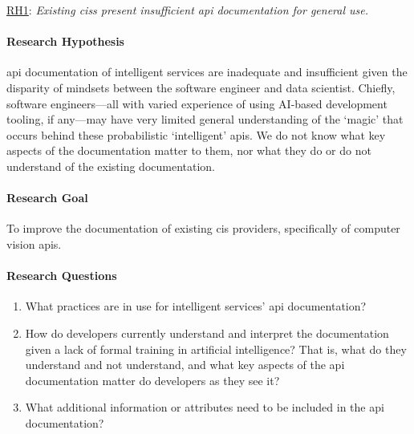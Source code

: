 \begin{titled-frame}{\underline{RH1}: \textit{Existing \glspl{cis} present insufficient \gls{api} documentation for general use.} }
\vspace{-12pt}
\paragraph{Research Hypothesis}
\gls{api} documentation of intelligent services are inadequate and insufficient given the disparity of mindsets between the software engineer and data scientist. Chiefly, software engineers---all with varied experience of using AI-based development tooling, if any---may have very limited general understanding of the `magic' that occurs behind these probabilistic `intelligent' \glspl{api}. We do not know what key aspects of the documentation matter to them, nor what they do or do not understand of the existing documentation.

\paragraph{Research Goal}
To improve the documentation of existing \gls{cis} providers, specifically of computer vision \glspl{api}.

\paragraph{Research Questions}
\begin{enumerate}[label=\textbf{RQ1.\arabic*.}, ref=RQ1.\arabic*, leftmargin=3.5\parindent, rightmargin=1\parindent]
  \item What practices are in use for intelligent services' \gls{api} documentation? 
  \label{rqs:apidoc:what-is-in-use}
  
  \item How do developers currently understand and interpret the documentation given a lack of formal training in artificial intelligence? That is, what do they understand and not understand, and what key aspects of the \gls{api} documentation matter do developers as they see it?
  \label{rqs:apidoc:how-do-devs-understand-it}
  
  \item What additional information or attributes need to be included in the \gls{api} documentation?
  \label{rqs:apidoc:what-additional-information-needed}
\end{enumerate}


\end{titled-frame}

